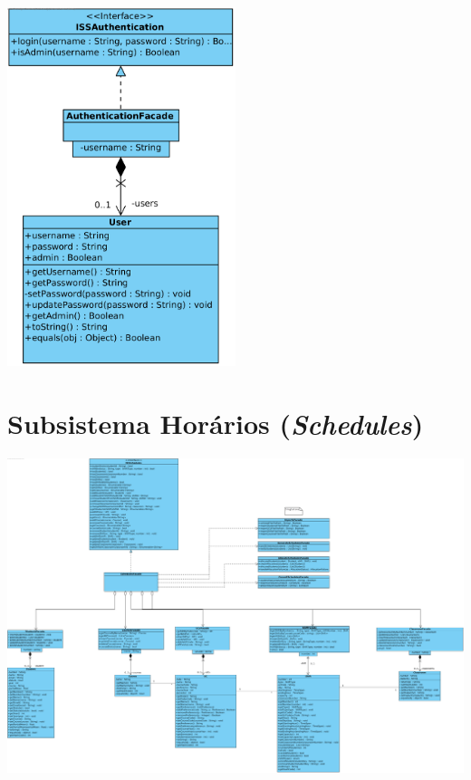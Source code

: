 \documentclass[a4paper,12pt]{scrreprt}
\begin{document}
\begin{minipage}{\textwidth}
    \centering
    \includegraphics[width=0.5\textwidth]{images/class-diagrams/2-authentication.png}
    \label{fig:5-2-subsistema_autenticacao}
\end{minipage}

\section{Subsistema Horários (\textit{Schedules})}

\begin{minipage}{\textwidth}
    \centering
    \includegraphics[width=1.5\textwidth, angle=270]{images/class-diagrams/3-schedules.png}
    \label{fig:5-3-subsistema_horarios}
\end{minipage}
\end{document}
